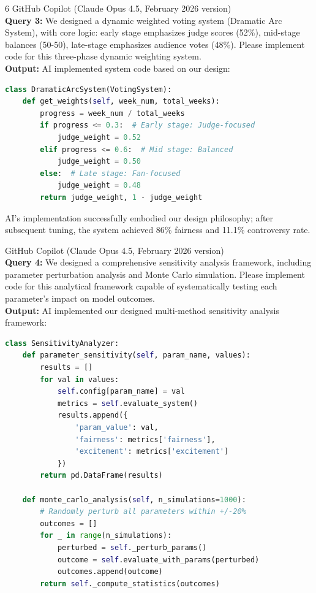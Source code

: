 \begin{ReportAiUse}{6}
GitHub Copilot (Claude Opus 4.5, February 2026 version)\\
\textbf{Query 3:} We designed a dynamic weighted voting system (Dramatic Arc System), with core logic: early stage emphasizes judge scores (52\%), mid-stage balances (50-50), late-stage emphasizes audience votes (48\%). Please implement code for this three-phase dynamic weighting system.\\
\textbf{Output:} AI implemented system code based on our design:
\begin{lstlisting}[language=python]
class DramaticArcSystem(VotingSystem):
    def get_weights(self, week_num, total_weeks):
        progress = week_num / total_weeks
        if progress <= 0.3:  # Early stage: Judge-focused
            judge_weight = 0.52
        elif progress <= 0.6:  # Mid stage: Balanced
            judge_weight = 0.50
        else:  # Late stage: Fan-focused
            judge_weight = 0.48
        return judge_weight, 1 - judge_weight
\end{lstlisting}
AI's implementation successfully embodied our design philosophy; after subsequent tuning, the system achieved 86\% fairness and 11.1\% controversy rate.

GitHub Copilot (Claude Opus 4.5, February 2026 version)\\
\textbf{Query 4:} We designed a comprehensive sensitivity analysis framework, including parameter perturbation analysis and Monte Carlo simulation. Please implement code for this analytical framework capable of systematically testing each parameter's impact on model outcomes.\\
\textbf{Output:} AI implemented our designed multi-method sensitivity analysis framework:
\begin{lstlisting}[language=python]
class SensitivityAnalyzer:
    def parameter_sensitivity(self, param_name, values):
        results = []
        for val in values:
            self.config[param_name] = val
            metrics = self.evaluate_system()
            results.append({
                'param_value': val,
                'fairness': metrics['fairness'],
                'excitement': metrics['excitement']
            })
        return pd.DataFrame(results)
    
    def monte_carlo_analysis(self, n_simulations=1000):
        # Randomly perturb all parameters within +/-20%
        outcomes = []
        for _ in range(n_simulations):
            perturbed = self._perturb_params()
            outcome = self.evaluate_with_params(perturbed)
            outcomes.append(outcome)
        return self._compute_statistics(outcomes)
\end{lstlisting}


\end{ReportAiUse}
